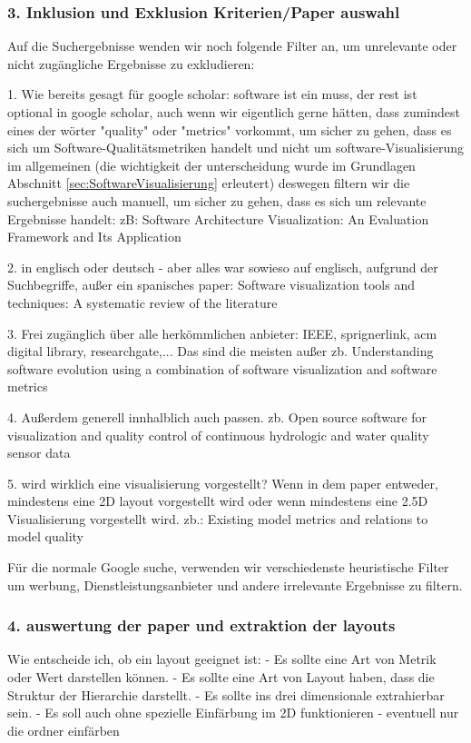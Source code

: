 \subsubsection*{3. Inklusion und Exklusion Kriterien/Paper auswahl} \label{sec:InklusionExklusionKriterien}
Auf die Suchergebnisse wenden wir noch folgende Filter an, um unrelevante oder nicht zugängliche Ergebnisse zu exkludieren:

1. Wie bereits gesagt für google scholar: software ist ein muss, der rest ist optional in google scholar, auch wenn wir eigentlich gerne hätten, dass zumindest eines der wörter "quality" oder "metrics" vorkommt, um sicher zu gehen, dass es sich um Software-Qualitätsmetriken handelt und nicht um software-Visualisierung im allgemeinen (die wichtigkeit der unterscheidung wurde im Grundlagen Abschnitt \ref{sec:SoftwareVisualisierung} erleutert) deswegen filtern wir die suchergebnisse auch manuell, um sicher zu gehen, dass es sich um relevante Ergebnisse handelt: zB: Software Architecture Visualization: An Evaluation Framework and Its Application \cite{gallagher2008software}

2. in englisch oder deutsch - aber alles war sowieso auf englisch, aufgrund der Suchbegriffe, außer ein spanisches paper: Software visualization tools and techniques: A systematic review of the literature\cite{cruz2016software}

3. Frei zugänglich über alle herkömmlichen anbieter: IEEE, sprignerlink, acm digital library, researchgate,... Das sind die meisten außer zb. Understanding software evolution using a combination of software visualization and software metrics \cite{lanza2002understanding}

4. Außerdem generell innhalblich auch passen. zb. Open source software for visualization and quality control of continuous hydrologic and water quality sensor data \cite{horsburgh2015open}

5. wird wirklich eine visualisierung vorgestellt? Wenn in dem paper entweder, mindestens eine 2D layout vorgestellt wird oder wenn mindestens eine 2.5D Visualisierung vorgestellt wird. zb.: Existing model metrics and relations to model quality \cite{mohagheghi2009existing}

Für die normale Google suche, verwenden wir verschiedenste heuristische Filter um werbung, Dienstleistungsanbieter und andere irrelevante Ergebnisse zu filtern.

\subsubsection*{4. auswertung der paper und extraktion der layouts} \label{sec:AuswertungPaper}
Wie entscheide ich, ob ein layout geeignet ist:
- Es sollte eine Art von Metrik oder Wert darstellen können.
- Es sollte eine Art von Layout haben, dass die Struktur der Hierarchie darstellt.
- Es sollte ins drei dimensionale extrahierbar sein.
- Es soll auch ohne spezielle Einfärbung im 2D funktionieren - eventuell nur die ordner einfärben

